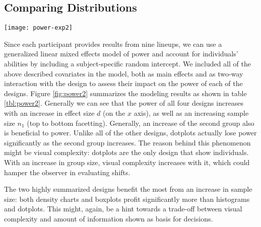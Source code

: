 
\subsection{Comparing Distributions}
\begin{figure*}[htbp] %
   \centering
   \texttt{[image: power-exp2]} 
   \caption{Overview of power predictions for the four different designs. The fully saturated thick lines show average predicted power for each of the designs facetted by size of the red group (top to bottom) and relative size of the blue group to the red group (left to right). Thin lines represent variability due to subject-specific abilities. }
   \label{fig:power2}
\end{figure*}

Since each participant provides results from nine lineups, we can use a generalized linear mixed effects model of power and account for individuals' abilities by including a subject-specific random intercept. We included all of the above described covariates  in the model, both as main effects and as two-way interaction with the design to assess their impact on the power of each of the designs.
Figure \ref{fig:power2} summarizes the modeling results as shown in table \ref{tbl:power2}. Generally we can see that the power of all four designs increases with an increase in effect size $d$ (on the $x$ axis), as well as an increasing sample size $n_1$ (top to bottom facetting). Generally, an increase of the second group also is beneficial to power. Unlike all of the other designs,  dotplots actually lose power significantly as the second group increases. 
The reason behind this phenomenon might be visual complexity: dotplots are the only design that show individuals. With an increase in group size, visual complexity increases with it, which could hamper the observer in evaluating shifts.


The two highly summarized designs benefit the most from an increase in sample size: both density charts and boxplots profit significantly more than histograms and dotplots. This might, again, be a hint towards a trade-off between visual complexity and amount of information shown as basis for decisions. 


